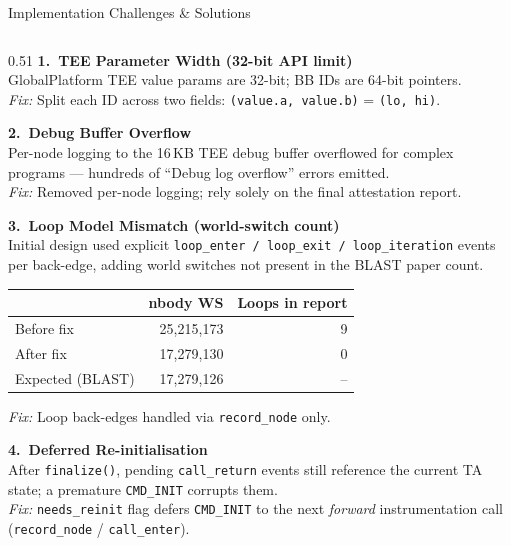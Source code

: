 \documentclass[aspectratio=169]{beamer}
\begin{document}
\begin{frame}{Implementation Challenges \& Solutions}
\begin{columns}[T]

\begin{column}{0.51\textwidth}
  \textbf{1.\ TEE Parameter Width (32-bit API limit)}\\[0.25em]
  GlobalPlatform TEE value params are 32-bit; BB IDs are 64-bit pointers.\\
  \textit{Fix:} Split each ID across two fields: \texttt{(value.a, value.b)} = \texttt{(lo, hi)}.

  \bigskip
  \textbf{2.\ Debug Buffer Overflow}\\[0.25em]
  Per-node logging to the 16\,KB TEE debug buffer overflowed for complex
  programs — hundreds of ``Debug log overflow'' errors emitted.\\
  \textit{Fix:} Removed per-node logging; rely solely on the final attestation report.

  \bigskip
  \textbf{3.\ Loop Model Mismatch (world-switch count)}\\[0.25em]
  Initial design used explicit \texttt{loop\_enter / loop\_exit / loop\_iteration}
  events per back-edge, adding world switches not present in the BLAST paper count.

  \smallskip
  \begin{tabular}{@{}lrr@{}}
    \toprule
     & \textbf{nbody WS} & \textbf{Loops in report} \\
    \midrule
    Before fix & 25,215,173 & 9 \\
    After fix  & 17,279,130 & 0 \\
    Expected (BLAST) & 17,279,126 & -- \\
    \bottomrule
  \end{tabular}

  \smallskip
  \textit{Fix:} Loop back-edges handled via \texttt{record\_node} only.

  \bigskip
  \textbf{4.\ Deferred Re-initialisation}\\[0.25em]
  After \texttt{finalize()}, pending \texttt{call\_return} events still reference the
  current TA state; a premature \texttt{CMD\_INIT} corrupts them.\\
  \textit{Fix:} \texttt{needs\_reinit} flag defers \texttt{CMD\_INIT} to the next
  \emph{forward} instrumentation call (\texttt{record\_node} / \texttt{call\_enter}).
\end{column}


\end{columns}
\end{frame}
\end{document}
